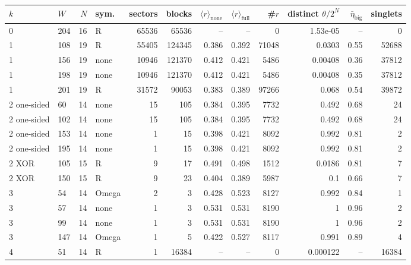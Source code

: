 \begin{tabular}{llrlrrrrrrrr}
\toprule
$k$ & $W$ & $N$ & sym. & sectors & blocks & $\langle r\rangle_\mathrm{none}$ & $\langle r\rangle_\mathrm{full}$ & \#$r$ & distinct $\theta/2^N$ & $\bar\eta_\mathrm{big}$ & singlets \\
\midrule
0 & 204 & 16 & R & 65536 & 65536 & -- & -- & 0 & 1.53e-05 & -- & 0 \\
1 & 108 & 19 & R & 55405 & 124345 & 0.386 & 0.392 & 71048 & 0.0303 & 0.55 & 52688 \\
1 & 156 & 19 & none & 10946 & 121370 & 0.412 & 0.421 & 5486 & 0.00408 & 0.36 & 37812 \\
1 & 198 & 19 & none & 10946 & 121370 & 0.412 & 0.421 & 5486 & 0.00408 & 0.35 & 37812 \\
1 & 201 & 19 & R & 31572 & 90053 & 0.383 & 0.389 & 97266 & 0.068 & 0.54 & 39872 \\
2 one-sided & 60 & 14 & none & 15 & 105 & 0.384 & 0.395 & 7732 & 0.492 & 0.68 & 24 \\
2 one-sided & 102 & 14 & none & 15 & 105 & 0.384 & 0.395 & 7732 & 0.492 & 0.68 & 24 \\
2 one-sided & 153 & 14 & none & 1 & 15 & 0.398 & 0.421 & 8092 & 0.992 & 0.81 & 2 \\
2 one-sided & 195 & 14 & none & 1 & 15 & 0.398 & 0.421 & 8092 & 0.992 & 0.81 & 2 \\
2 XOR & 105 & 15 & R & 9 & 17 & 0.491 & 0.498 & 1512 & 0.0186 & 0.81 & 7 \\
2 XOR & 150 & 15 & R & 9 & 23 & 0.404 & 0.389 & 5987 & 0.1 & 0.66 & 7 \\
3 & 54 & 14 & Omega & 2 & 3 & 0.428 & 0.523 & 8127 & 0.992 & 0.84 & 1 \\
3 & 57 & 14 & none & 1 & 3 & 0.531 & 0.531 & 8190 & 1 & 0.96 & 2 \\
3 & 99 & 14 & none & 1 & 3 & 0.531 & 0.531 & 8190 & 1 & 0.96 & 2 \\
3 & 147 & 14 & Omega & 1 & 5 & 0.422 & 0.527 & 8117 & 0.991 & 0.89 & 4 \\
4 & 51 & 14 & R & 1 & 16384 & -- & -- & 0 & 0.000122 & -- & 16384 \\
\bottomrule
\end{tabular}
